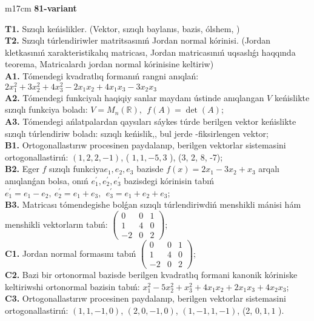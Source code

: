 \documentclass{article}
\begin{document}
\begin{tabular}{m{17cm}}
\textbf{81-variant}
\newline

\textbf{T1.} Sızıqlı keńislikler.   (Vektor,  sızıqlı baylanıs, bazis, ólshem, )  \\
\textbf{T2.} Sızıqlı túrlendiriwler matritsasınıń Jordan normal kórinisi. (Jordan kletkasınıń xarakteristikalıq matricası, Jordan matricasınıń uqsaslıǵı haqqında teorema,  Matricalardı jordan normal kórinisine keltiriw) \\
\textbf{A1.} Tómendegi kvadratlıq formanıń rangni anıqlań: \(2x_{1}^{2} + 3x_{2}^{2} + 4x_{3}^{2} - 2x_{1}x_{2} + 4x_{1}x_{3} - 3x_{2}x_{3}\) \\
\textbf{A2.} Tómendegi funkciyalı haqiqiy sanlar maydanı ústinde anıqlangan \(V\) keńislikte sızıqlı funkciya boladı: \(V = M_{n}\left( \mathbb{R} \right),\ \ f(A) = \det(A)\); \\
\textbf{A3.} Tómendegi ańlatpalardan qaysıları sáykes túrde berilgen vektor keńislikte sızıqlı túrlendiriw boladı: sızıqlı keńislik,, bul jerde -fiksirlengen vektor; \\
\textbf{B1.} Ortogonallastırıw procesinen paydalanıp, berilgen vektorlar sistemasini ortogonallastirıń: \((1,2,2, - 1)\), ( \(1,1, - 5,3\) ), (3, 2, 8, -7); \\
\textbf{B2.} Eger \(f\) sızıqlı funkciya\(e_{1},e_{2},e_{3}\) bazisde \(f(x) = 2x_{1} - 3x_{2} + x_{3}\) arqalı anıqlanǵan bolsa, onıń \(e_{1}^{'},e_{2}^{'},e_{3}^{'}\) bazisdegi kórinisin tabıń\(e_{1}^{'} = e_{1} - e_{2},\ e_{2}^{'} = e_{1} + e_{3},\ \ e_{3}^{'} = e_{1} + e_{2} + e_{3}\); \\
\textbf{B3.} Matricası tómendegishe bolǵan sızıqlı túrlendiriwdiń menshikli mánisi hám menshikli vektorların tabıń: \(\begin{pmatrix} 0 & 0 & 1 \\ 1 & 4 & 0 \\  - 2 & 0 & 2 \end{pmatrix}\); \\
\textbf{C1.} Jordan normal formasını tabıń \(\begin{pmatrix} 0 & 0 & 1 \\ 1 & 4 & 0 \\  - 2 & 0 & 2 \end{pmatrix}\); \\
\textbf{C2.} Bazi bir ortonormal bazisde berilgen kvadratlıq formani kanonik kóriniske keltiriwshi ortonormal bazisin tabıń: \(x_{1}^{2} - 5x_{2}^{2} + x_{3}^{2} + 4x_{1}x_{2} + 2x_{1}x_{3} + 4x_{2}x_{3}\); \\
\textbf{C3.} Ortogonallastırıw procesinen paydalanıp, berilgen vektorlar sistemasini ortogonallastirıń: \((1,1, - 1,0)\), \((2,0, - 1,0)\), \((1, - 1,1, - 1)\), (2, \(0,1,1\) ). \\

\end{tabular}
\vspace{1cm}
\end{document}
